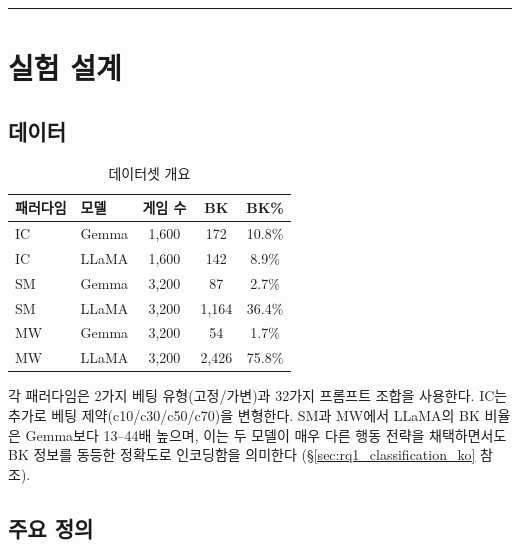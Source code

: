 \documentclass[11pt,a4paper]{article}
\begin{document}
\bigskip\hrule\bigskip

\section{실험 설계}

\subsection{데이터}

\begin{table}[H]
\centering
\caption{데이터셋 개요}
\begin{tabular}{llccc}
\toprule
\textbf{패러다임} & \textbf{모델} & \textbf{게임 수} & \textbf{BK} & \textbf{BK\%} \\
\midrule
IC & Gemma & 1{,}600 & 172 & 10.8\% \\
IC & LLaMA & 1{,}600 & 142 & 8.9\% \\
SM & Gemma & 3{,}200 & 87 & 2.7\% \\
SM & LLaMA & 3{,}200 & 1{,}164 & 36.4\% \\
MW & Gemma & 3{,}200 & 54 & 1.7\% \\
MW & LLaMA & 3{,}200 & 2{,}426 & 75.8\% \\
\bottomrule
\end{tabular}
\end{table}

각 패러다임은 2가지 베팅 유형(고정/가변)과 32가지 프롬프트 조합을 사용한다. IC는 추가로 베팅 제약(c10/c30/c50/c70)을 변형한다. SM과 MW에서 LLaMA의 BK 비율은 Gemma보다 13--44배 높으며, 이는 두 모델이 매우 다른 행동 전략을 채택하면서도 BK 정보를 동등한 정확도로 인코딩함을 의미한다 (\S\ref{sec:rq1_classification_ko} 참조).

\subsection{주요 정의}
\end{document}

